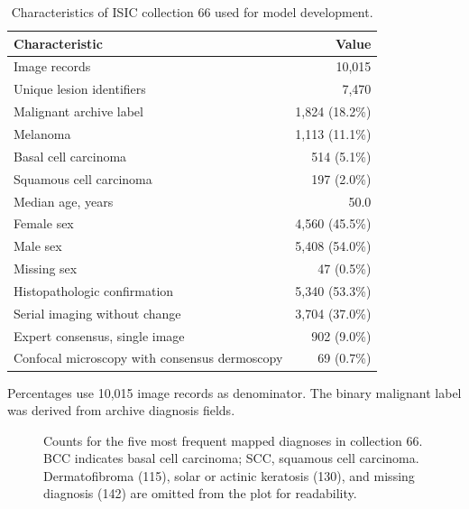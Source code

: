 \documentclass[11pt]{article}
\begin{document}
\begin{table}[H]
\centering
\caption{Characteristics of ISIC collection 66 used for model development.}
\label{tab:cohort}
\begin{threeparttable}
\begin{tabular}{lr}
\toprule
Characteristic & Value \\
\midrule
Image records & 10,015 \\
Unique lesion identifiers & 7,470 \\
Malignant archive label & 1,824 (18.2\%) \\
Melanoma & 1,113 (11.1\%) \\
Basal cell carcinoma & 514 (5.1\%) \\
Squamous cell carcinoma & 197 (2.0\%) \\
Median age, years & 50.0 \\
Female sex & 4,560 (45.5\%) \\
Male sex & 5,408 (54.0\%) \\
Missing sex & 47 (0.5\%) \\
Histopathologic confirmation & 5,340 (53.3\%) \\
Serial imaging without change & 3,704 (37.0\%) \\
Expert consensus, single image & 902 (9.0\%) \\
Confocal microscopy with consensus dermoscopy & 69 (0.7\%) \\
\bottomrule
\end{tabular}
\begin{tablenotes}[flushleft]\footnotesize
\item Percentages use 10,015 image records as denominator. The binary malignant label was derived from archive diagnosis fields.
\end{tablenotes}
\end{threeparttable}
\end{table}

\begin{figure}[H]
\centering
{}
\caption{Counts for the five most frequent mapped diagnoses in collection 66. BCC indicates basal cell carcinoma; SCC, squamous cell carcinoma. Dermatofibroma (115), solar or actinic keratosis (130), and missing diagnosis (142) are omitted from the plot for readability.}
\label{fig:diagnosis}
\end{figure}
\end{document}
